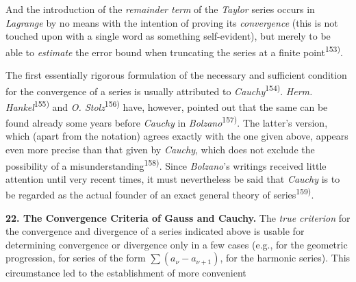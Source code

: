 \thispagestyle{fancy}

\vspace{0.5cm}

And the introduction of the \textit{remainder term} of the \textit{Taylor} series occurs in \textit{Lagrange} by no means with the intention of proving its \textit{convergence} (this is not touched upon with a single word as something self-evident), but merely to be able to \textit{estimate} the error bound when truncating the series at a finite point\textsuperscript{153)}.

The first essentially rigorous formulation of the necessary and sufficient condition for the convergence of a series is usually attributed to \textit{Cauchy}\textsuperscript{154)}. \textit{Herm. Hankel}\textsuperscript{155)} and \textit{O. Stolz}\textsuperscript{156)} have, however, pointed out that the same can be found already some years before \textit{Cauchy} in \textit{Bolzano}\textsuperscript{157)}. The latter's version, which (apart from the notation) agrees exactly with the one given above, appears even more precise than that given by \textit{Cauchy}, which does not exclude the possibility of a misunderstanding\textsuperscript{158)}. Since \textit{Bolzano}'s writings received little attention until very recent times, it must nevertheless be said that \textit{Cauchy} is to be regarded as the actual founder of an exact general theory of series\textsuperscript{159)}.

\vspace{0.5cm}
\textbf{22. The Convergence Criteria of Gauss and Cauchy.} The \textit{true criterion} for the convergence and divergence of a series indicated above is usable for determining convergence or divergence only in a few cases (e.g., for the geometric progression, for series of the form $\sum(a_\nu - a_{\nu+1})$, for the harmonic series). This circumstance led to the establishment of more convenient

